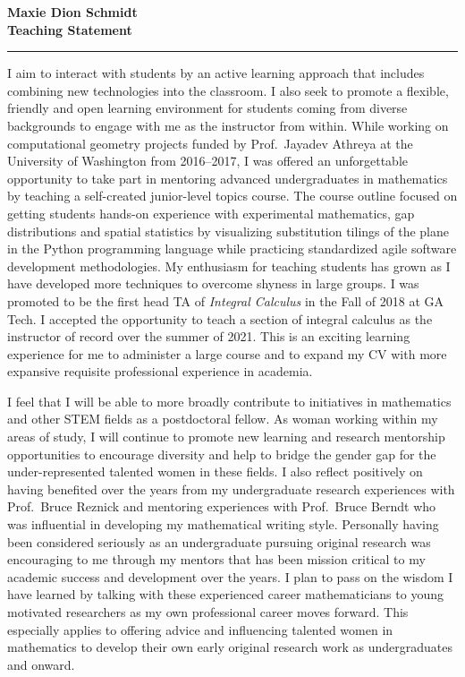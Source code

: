 \documentclass[10pt,reqno,letterpaper]{article}
\theoremstyle{plain}
\numberwithin{theorem}{section}
\theoremstyle{definition}
\begin{document}
\noindent 
{\bfseries\Large Maxie Dion Schmidt} \\[0.5ex]
{\bfseries\Large Teaching Statement} \\ 
\hrule\medskip

I aim to interact with students by an active learning approach 
that includes combining new technologies into the classroom. 
I also seek to promote a flexible, friendly and open learning environment for 
students coming from diverse backgrounds to engage with me as the instructor from within.
While working on computational geometry projects funded by 
Prof.~Jayadev Athreya at the University of Washington from 2016--2017, 
I was offered an unforgettable opportunity to take part in mentoring advanced undergraduates 
in mathematics by teaching a self-created junior-level topics course. The course outline 
focused on getting students hands-on experience with experimental mathematics, 
gap distributions and spatial statistics by visualizing substitution tilings of the 
plane in the Python programming language while practicing 
standardized agile software development methodologies. 
My enthusiasm for teaching students 
has grown as I have developed more techniques to overcome shyness in large groups. 
I was promoted to be the first head TA of \emph{Integral Calculus} in the Fall of 2018 at GA Tech. 
I accepted the opportunity to teach a section of integral calculus 
as the instructor of record over the summer of 2021. 
This is an exciting learning experience for me to administer a large course 
and to expand my CV with more expansive requisite professional experience in academia. 

I feel that I will be able to more broadly contribute 
to initiatives in mathematics and other STEM fields as a 
postdoctoral fellow. 
As woman working within my areas of study, I will continue to promote new learning 
and research mentorship opportunities to encourage diversity and help to bridge the gender 
gap for the under-represented talented women in these fields.
I also reflect positively on having benefited over the years from my undergraduate research experiences 
with Prof.~Bruce Reznick and 
mentoring experiences with Prof.~Bruce Berndt who was influential in 
developing my mathematical writing style.
Personally having been considered seriously as an 
undergraduate pursuing original research was encouraging to me through 
my mentors that has been mission critical to my academic success and development over the years. 
I plan to pass on the wisdom I have learned
by talking with these experienced career mathematicians to young motivated researchers as my 
own professional career moves forward. This especially applies to offering advice and 
influencing talented women in mathematics to develop their own early original 
research work as undergraduates and onward. 
\end{document}
